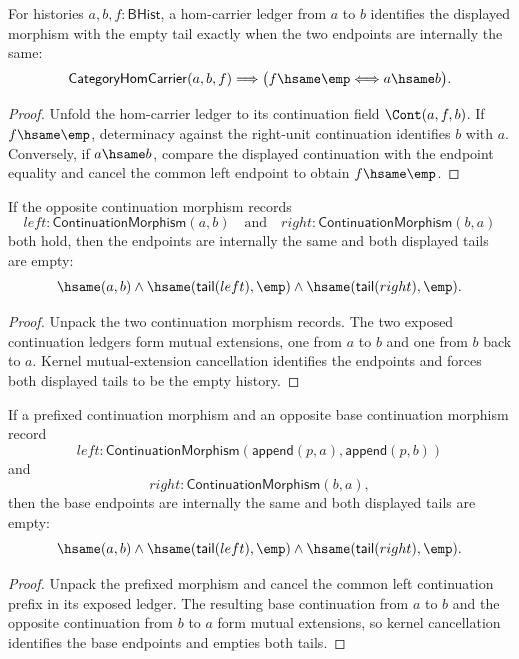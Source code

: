 \begin{theorem}
\label{thm:category-hom-carrier-morphism-empty-endpoint-iff}
For histories $a,b,f:\mathsf{BHist}$, a hom-carrier ledger from $a$ to $b$
identifies the displayed morphism with the empty tail exactly when the two
endpoints are internally the same:
$$
\mathsf{CategoryHomCarrier}(a,b,f)\Longrightarrow
\bigl(f\hsame\emp\Longleftrightarrow a\hsame b\bigr).
$$
\end{theorem}
\begin{proof}
Unfold the hom-carrier ledger to its continuation field $\Cont(a,f,b)$. If
$f\hsame\emp$, determinacy against the right-unit continuation identifies
$b$ with $a$. Conversely, if $a\hsame b$, compare the displayed continuation
with the endpoint equality and cancel the common left endpoint to obtain
$f\hsame\emp$.
\end{proof}

\begin{theorem}
\label{thm:continuation-morphism-cycle-tails-empty}
If the opposite continuation morphism records
$$
left:\mathsf{ContinuationMorphism}(a,b)
\quad\text{and}\quad
right:\mathsf{ContinuationMorphism}(b,a)
$$
both hold, then the endpoints are internally the same and both displayed tails
are empty:
$$
\hsame(a,b)\land
\hsame(\mathsf{tail}(left),\emp)\land
\hsame(\mathsf{tail}(right),\emp).
$$
\end{theorem}
\begin{proof}
Unpack the two continuation morphism records. The two exposed continuation
ledgers form mutual extensions, one from $a$ to $b$ and one from $b$ back to
$a$. Kernel mutual-extension cancellation identifies the endpoints and forces
both displayed tails to be the empty history.
\end{proof}

\begin{theorem}
\label{thm:continuation-morphism-prefix-cycle-tails-empty}
If a prefixed continuation morphism and an opposite base continuation morphism
record
$$
left:\mathsf{ContinuationMorphism}(\mathsf{append}(p,a),\mathsf{append}(p,b))
$$
and
$$
right:\mathsf{ContinuationMorphism}(b,a),
$$
then the base endpoints are internally the same and both displayed tails are
empty:
$$
\hsame(a,b)\land
\hsame(\mathsf{tail}(left),\emp)\land
\hsame(\mathsf{tail}(right),\emp).
$$
\end{theorem}
\begin{proof}
Unpack the prefixed morphism and cancel the common left continuation prefix in
its exposed ledger. The resulting base continuation from $a$ to $b$ and the
opposite continuation from $b$ to $a$ form mutual extensions, so kernel
cancellation identifies the base endpoints and empties both tails.
\end{proof}


